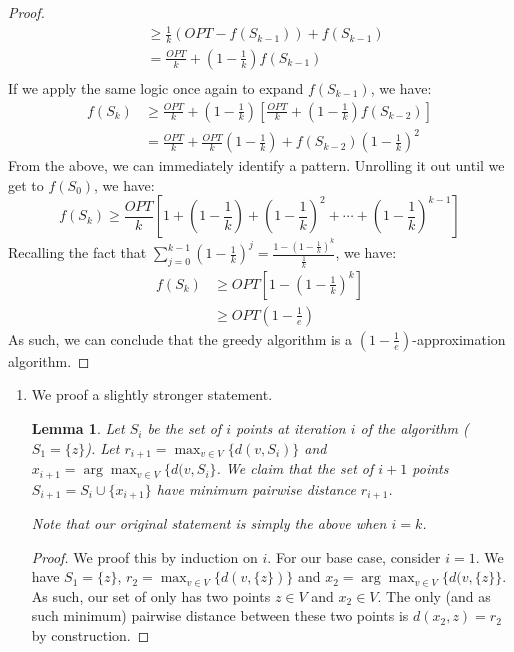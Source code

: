 \documentclass[12pt]{exam}
\newtheorem{lemma}[theorem]{Lemma}
\newcommand{\Q}[1]{\question{\large{\textbf{#1}}}}
\begin{document}
\begin{questions}
\begin{solution}
\begin{enumerate}[label=(\alph*)]
\begin{proof}
\begin{align*}
          &\geq \frac{1}{k}(OPT - f(S_{k-1})) + f(S_{k-1}) \tag{Results from (c)} \\
          &= \frac{OPT}{k} + (1 - \frac{1}{k})f(S_{k-1}) \tag{Simplifying} \\
        \end{align*}
        If we apply the same logic once again to expand $f(S_{k-1})$, we have:
        \begin{align*}
          f(S_k) &\geq \frac{OPT}{k} + (1 - \frac{1}{k})\left[ \frac{OPT}{k} + (1 - \frac{1}{k})f(S_{k-2})  \right] \\
          &= \frac{OPT}{k} + \frac{OPT}{k}(1 - \frac{1}{k}) + f(S_{k-2})(1 - \frac{1}{k})^2
        \end{align*}
        From the above, we can immediately identify a pattern. Unrolling it out until we get to $f(S_0)$, we have:
        \[
          f(S_k) \geq \frac{OPT}{k} \left[1 + (1 - \frac{1}{k}) + (1 - \frac{1}{k})^2 + \cdots + (1 - \frac{1}{k})^{k-1} \right]
        \]
        Recalling the fact that $\sum_{j=0}^{k-1} (1 - \frac{1}{k})^j = \frac{1 - (1 - \frac{1}{k})^k}{\frac{1}{k}}$, we have:
        \begin{align*}
          f(S_k) &\geq OPT \left[1 - (1 - \frac{1}{k})^k  \right] \\
          &\geq OPT(1 - \frac{1}{e}) \tag{From Problem 19}
        \end{align*}
        As such, we can conclude that the greedy algorithm is a $(1 - \frac{1}{e})$-approximation algorithm.
      \end{proof}
  \end{enumerate}
\end{solution}

\newpage
\Q{Problem 21}
\begin{solution}
  \begin{enumerate}[label=(\alph*)]
    \item We proof a slightly stronger statement. 
    \begin{lemma}
      Let $S_i$ be the set of $i$ points at iteration $i$ of the algorithm ($S_1 = \{z\}$). Let $r_{i+1} = \max_{v \in V} \{d(v, S_i) \}$ and $x_{i+1} = \arg\max_{v \in V} \{ d(v, S_i \}$. We claim that the set of $i + 1$ points $S_{i+1} = S_i \cup \{ x_{i+1} \}$ have minimum pairwise distance $r_{i+1}$.

      Note that our original statement is simply the above when $i = k$.
    \end{lemma}
    \begin{proof}
      We proof this by induction on $i$. For our base case, consider $i = 1$. We have $S_1 = \{ z\}$, $r_{2} = \max_{v \in V} \{d(v, \{z\}) \}$ and $x_{2} = \arg\max_{v \in V} \{ d(v,\{z\}\}$. As such, our set of only has two points $z \in V$ and $x_2 \in V$. The only (and as such minimum) pairwise distance between these two points is $d(x_2,z) = r_2$ by construction.



\end{proof}
\end{enumerate}
\end{solution}
\end{questions}
\end{document}
